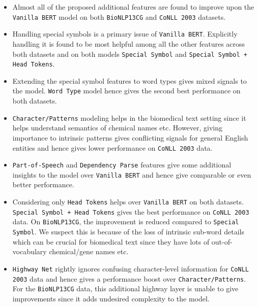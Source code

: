 \begin{itemize}
    \item Almost all of the proposed additional features are found to improve upon the \texttt{Vanilla BERT} model on both \texttt{BioNLP13CG} and \texttt{CoNLL 2003} datasets.
    
    \item Handling special symbols is a primary issue of \texttt{Vanilla BERT}. Explicitly handling it is found to be most helpful among all the other features across both datasets and on both models \texttt{Special Symbol} and \texttt{Special Symbol + Head Tokens}.
    
    \item Extending the special symbol features to word types gives mixed signals to the model. \texttt{Word Type} model hence gives the second best performance on both datasets.
    
    \item \texttt{Character/Patterns} modeling helps in the biomedical text setting since it helps understand semantics of chemical names etc. However, giving importance to intrinsic patterns gives conflicting signals for general English entities and hence gives lower performance on \texttt{CoNLL 2003} data.
    
    \item \texttt{Part-of-Speech} and \texttt{Dependency Parse} features give some additional insights to the model over \texttt{Vanilla BERT} and hence give comparable or even better performance. 
    
    \item Considering only \texttt{Head Tokens} helps over \texttt{Vanilla BERT} on both datasets. \texttt{Special Symbol + Head Tokens} gives the best performance on \texttt{CoNLL 2003} data. On \texttt{BioNLP13CG}, the improvement is reduced compared to \texttt{Special Symbol}. We suspect this is because of the loss of intrinsic sub-word details which can be crucial for biomedical text since they have lots of out-of-vocabulary chemical/gene names etc.
    
    \item \texttt{Highway Net} rightly ignores confusing character-level information for \texttt{CoNLL 2003} data and hence gives a performance boost over \texttt{Character/Patterns}. For the \texttt{BioNLP13CG} data, this additional highway layer is unable to give improvements since it adds undesired complexity to the model.
\end{itemize}

